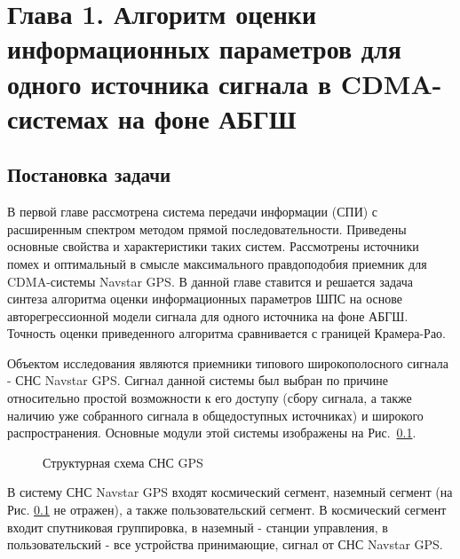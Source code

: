 \setcounter{chapter}{1}
\setcounter{equation}{0}
\chapter*{Глава 1. Алгоритм оценки информационных параметров для одного источника сигнала в CDMA-системах на фоне АБГШ}

\section{Постановка задачи}
В первой главе рассмотрена система передачи информации (СПИ) с расширенным спектром методом прямой последовательности. Приведены основные свойства и характеристики
таких систем. Рассмотрены источники помех и оптимальный в смысле максимального правдоподобия приемник для CDMA-системы Navstar GPS. В данной главе ставится и решается задача синтеза  
алгоритма оценки информационных параметров ШПС на основе авторегрессионной модели сигнала для одного источника на фоне АБГШ. Точность оценки приведенного алгоритма сравнивается с границей Крамера-Рао. 

Объектом исследования являются приемники типового широкополосного сигнала - СНС Navstar GPS.
Сигнал данной системы был выбран по причине относительно простой возможности к его доступу (сбору сигнала, а также наличию уже собранного сигнала в общедоступных источниках) и широкого распространения.
Основные модули этой системы изображены на \mbox{Рис. \ref{pic:sec1_gnss_system}.}
\begin{figure}[h]
	\center{}
	\caption{Структурная схема СНС GPS}
	\label{pic:sec1_gnss_system}
\end{figure}
В систему СНС Navstar GPS входят космический сегмент, наземный сегмент (на Рис. \ref{pic:sec1_gnss_system} не
отражен), а также пользовательский сегмент. В космический сегмент входит спутниковая группировка, в 
наземный - станции управления, в пользовательский - все устройства принимающие, сигнал от СНС Navstar GPS.

